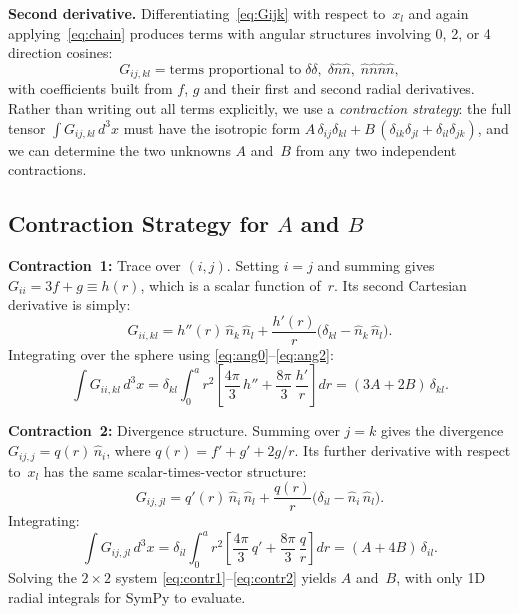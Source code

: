 \textbf{Second derivative.}  Differentiating~\eqref{eq:Gijk} with respect
to~$x_l$ and again applying~\eqref{eq:chain} produces terms with angular
structures involving 0, 2, or 4 direction cosines:
\begin{equation}
  G_{ij,kl} = \text{terms proportional to}
  \;\delta\delta,\;\delta\hat{n}\hat{n},\;\hat{n}\hat{n}\hat{n}\hat{n},
\label{eq:Gijkl}
\end{equation}
with coefficients built from $f$, $g$ and their first and second radial
derivatives.  Rather than writing out all terms explicitly, we use a
\emph{contraction strategy}: the full tensor
$\int G_{ij,kl}\,d^3x$ must have the isotropic form
$A\,\delta_{ij}\delta_{kl} + B\,(\delta_{ik}\delta_{jl}+\delta_{il}\delta_{jk})$,
and we can determine the two unknowns $A$ and~$B$ from any two independent
contractions.

\subsection{Contraction Strategy for $A$ and $B$}

\textbf{Contraction~1:}  Trace over $(i,j)$.  Setting $i=j$ and summing
gives $G_{ii} = 3f + g \equiv h(r)$, which is a scalar function of~$r$.
Its second Cartesian derivative is simply:
\begin{equation}
  G_{ii,kl} = h''(r)\,\hat{n}_k\,\hat{n}_l
  + \frac{h'(r)}{r}\bigl(\delta_{kl} - \hat{n}_k\,\hat{n}_l\bigr).
\label{eq:trace1}
\end{equation}
Integrating over the sphere using \eqref{eq:ang0}--\eqref{eq:ang2}:
\begin{equation}
  \int G_{ii,kl}\,d^3x
  = \delta_{kl} \int_0^a r^2
    \left[\frac{4\pi}{3}\,h'' + \frac{8\pi}{3}\,\frac{h'}{r}\right] dr
  = (3A + 2B)\,\delta_{kl}.
\label{eq:contr1}
\end{equation}

\textbf{Contraction~2:}  Divergence structure.  Summing over $j=k$ gives
the divergence $G_{ij,j} = q(r)\,\hat{n}_i$, where
$q(r) = f' + g' + 2g/r$.  Its further derivative with respect to~$x_l$ has
the same scalar-times-vector structure:
\begin{equation}
  G_{ij,jl} = q'(r)\,\hat{n}_i\,\hat{n}_l
  + \frac{q(r)}{r}\bigl(\delta_{il} - \hat{n}_i\,\hat{n}_l\bigr).
\label{eq:divG}
\end{equation}
Integrating:
\begin{equation}
  \int G_{ij,jl}\,d^3x
  = \delta_{il} \int_0^a r^2
    \left[\frac{4\pi}{3}\,q' + \frac{8\pi}{3}\,\frac{q}{r}\right] dr
  = (A + 4B)\,\delta_{il}.
\label{eq:contr2}
\end{equation}
Solving the $2\times 2$ system \eqref{eq:contr1}--\eqref{eq:contr2} yields
$A$ and~$B$, with only 1D radial integrals for SymPy to evaluate.


